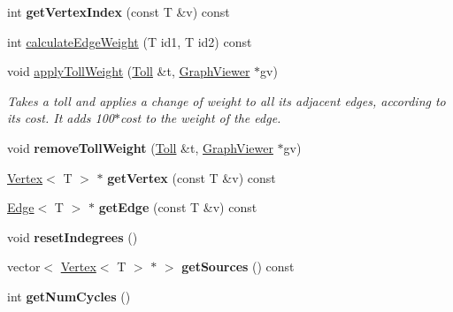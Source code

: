 \begin{DoxyCompactItemize}
\item 
\hypertarget{class_graph_a98ad6f08d48ceb7527cb37433c0efc56}{}int {\bfseries get\+Vertex\+Index} (const T \&v) const \label{class_graph_a98ad6f08d48ceb7527cb37433c0efc56}

\item 
int \hyperlink{class_graph_a41708134b9e518beea032e6e62d84bef}{calculate\+Edge\+Weight} (T id1, T id2) const 
\item 
void \hyperlink{class_graph_a7b9a7f15067572593b8be54c59ac1b32}{apply\+Toll\+Weight} (\hyperlink{class_toll}{Toll} \&t, \hyperlink{class_graph_viewer}{Graph\+Viewer} $\ast$gv)
\begin{DoxyCompactList}\small\item\em Takes a toll and applies a change of weight to all its adjacent edges, according to its cost. It adds 100$\ast$cost to the weight of the edge. \end{DoxyCompactList}\item 
\hypertarget{class_graph_adbb6e61a997bdd22911d5f38361d38bd}{}void {\bfseries remove\+Toll\+Weight} (\hyperlink{class_toll}{Toll} \&t, \hyperlink{class_graph_viewer}{Graph\+Viewer} $\ast$gv)\label{class_graph_adbb6e61a997bdd22911d5f38361d38bd}

\item 
\hypertarget{class_graph_a08a95472b0d9bd7321660940807af060}{}\hyperlink{class_vertex}{Vertex}$<$ T $>$ $\ast$ {\bfseries get\+Vertex} (const T \&v) const \label{class_graph_a08a95472b0d9bd7321660940807af060}

\item 
\hypertarget{class_graph_a45b90c42b1fd441a721cb3af43d07f07}{}\hyperlink{class_edge}{Edge}$<$ T $>$ $\ast$ {\bfseries get\+Edge} (const T \&v) const \label{class_graph_a45b90c42b1fd441a721cb3af43d07f07}

\item 
\hypertarget{class_graph_af34eb86d804272e6e3e221a9ed688c53}{}void {\bfseries reset\+Indegrees} ()\label{class_graph_af34eb86d804272e6e3e221a9ed688c53}

\item 
\hypertarget{class_graph_aa1a3c754f51a888e25dff2b26dfb85fc}{}vector$<$ \hyperlink{class_vertex}{Vertex}$<$ T $>$ $\ast$ $>$ {\bfseries get\+Sources} () const \label{class_graph_aa1a3c754f51a888e25dff2b26dfb85fc}

\item 
\hypertarget{class_graph_a694dff81073c38b669057f0c6bd4cbb1}{}int {\bfseries get\+Num\+Cycles} ()\label{class_graph_a694dff81073c38b669057f0c6bd4cbb1}


\end{DoxyCompactItemize}
